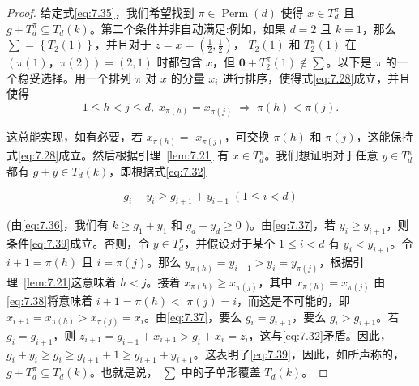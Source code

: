 \begin{proof}
给定式\eqref{eq:7.35}，我们希望找到 \(\pi  \in  \operatorname{Perm}\left( d\right)\) 使得 \(x \in  {T}_{d}^{\pi }\) 且 \(g + {T}_{d}^{\pi } \subseteq  {T}_{d}\left( k\right)\)。第二个条件并非自动满足:例如，如果 \(d = 2\) 且 \(k = 1\)，那么 \(\sum  = \left\{  {{T}_{2}\left( 1\right) }\right\}\)，并且对于 \(z = x = \left( {\frac{1}{2},\frac{1}{2}}\right)\)， \({T}_{2}\left( 1\right)\) 和 \({T}_{2}^{\pi }\left( 1\right)\) 在 \(\left( {\pi \left( 1\right)，\pi \left( 2\right) }\right)  = \left( {2,1}\right)\) 时都包含 \(x\)，但 \(\mathbf{0} + {T}_{2}^{\pi }\left( 1\right)  \notin  \sum\)。以下是 \(\pi\) 的一个稳妥选择。用一个排列 \(\pi\) 对 \(x\) 的分量 \({x}_{i}\) 进行排序，使得式\eqref{eq:7.28}成立，并且使得
\begin{equation}
1 \leq  h < j \leq  d,\;{x}_{\pi \left( h\right) } = {x}_{\pi \left( j\right) }\; \Rightarrow  \;\pi \left( h\right)  < \pi \left( j\right) .\label{eq:7.38}
\end{equation}

这总能实现，如有必要，若 \({x}_{\pi \left( h\right) } =\)  \({x}_{\pi \left( j\right) }\)，可交换 \(\pi \left( h\right)\) 和 \(\pi \left( j\right)\)，这能保持式\eqref{eq:7.28}成立。然后根据引理~\ref{lem:7.21} 有 \(x \in  {T}_{d}^{\pi }\)。我们想证明对于任意 \(y \in  {T}_{d}^{\pi }\) 都有 \(g + y \in  {T}_{d}\left( k\right)\)，即根据式\eqref{eq:7.32}

\begin{equation}
{g}_{i} + {y}_{i} \geq  {g}_{i + 1} + {y}_{i + 1}\;\left( {1 \leq  i < d}\right)\label{eq:7.39}
\end{equation}

(由\eqref{eq:7.36}，我们有 \(k \geq  {g}_{1} + {y}_{1}\) 和 \({g}_{d} + {y}_{d} \geq  0\) )。由\eqref{eq:7.37}，若 \({y}_{i} \geq  {y}_{i + 1}\)，则条件\eqref{eq:7.39}成立。否则，令 \(y \in  {T}_{d}^{\pi }\)，并假设对于某个 \(1 \leq  i < d\) 有 \({y}_{i} < {y}_{i + 1}\)。令 \(i + 1 = \pi \left( h\right)\) 且 \(i = \pi \left( j\right)\)。那么 \({y}_{\pi \left( h\right) } = {y}_{i + 1} > {y}_{i} = {y}_{\pi \left( j\right) }\)，根据引理~\ref{lem:7.21}这意味着 \(h < j\)。接着 \({x}_{\pi \left( h\right) } \geq  {x}_{\pi \left( j\right) }\)，其中 \({x}_{\pi \left( h\right) } = {x}_{\pi \left( j\right) }\) 由\eqref{eq:7.38}将意味着 \(i + 1 = \pi \left( h\right)  <\)  \(\pi \left( j\right)  = i\)，而这是不可能的，即 \({x}_{i + 1} = {x}_{\pi \left( h\right) } > {x}_{\pi \left( j\right) } = {x}_{i}\)。由\eqref{eq:7.37}，要么 \({g}_{i} = {g}_{i + 1}\)，要么 \({g}_{i} > {g}_{i + 1}\)。若 \({g}_{i} = {g}_{i + 1}\)，则 \({z}_{i + 1} = {g}_{i + 1} + {x}_{i + 1} > {g}_{i} + {x}_{i} = {z}_{i}\)，这与\eqref{eq:7.32}矛盾。因此， \({g}_{i} + {y}_{i} \geq  {g}_{i} \geq  {g}_{i + 1} + 1 \geq  {g}_{i + 1} + {y}_{i + 1}\)。这表明了\eqref{eq:7.39}，因此，如所声称的， \(g + {T}_{d}^{\pi } \subseteq  {T}_{d}\left( k\right)\)。也就是说， \(\sum\) 中的子单形覆盖 \({T}_{d}\left( k\right)\)。


\end{proof}
